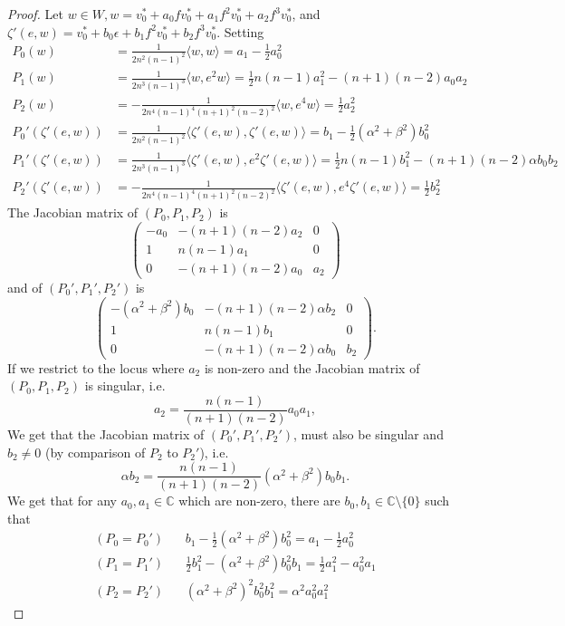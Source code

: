 \documentclass[10pt,a4paper]{amsart}
\newcommand{\CC}{\mathbb{C}}
\begin{document}
\begin{proof}
    Let $w\in W, w = v_0^*+a_0fv_0^* + a_1f^2v_0^* + a_2 f^3v_0^*$, and $\zeta'(e, w) = v_0^* + b_0\epsilon + b_1f^2v_0^* + b_2f^3v_0^*$.
    Setting
    \[\begin{aligned}
        P_0(w) &= \frac{1}{2n^2(n-1)^2}\langle w, w\rangle = a_1-\frac{1}{2}a_0^2\\
        P_1(w) &= \frac{1}{2n^3(n-1)^3}\langle w, e^2 w\rangle = \frac{1}{2}n(n-1)a_1^2 - (n+1)(n-2)a_0a_2\\
        P_2(w) &= -\frac{1}{2n^4(n-1)^4(n+1)^2(n-2)^2}\langle w, e^4 w\rangle = \frac{1}{2}a_2^2\\
        P_0'(\zeta'(e, w)) &= \frac{1}{2n^2(n-1)^2}\langle \zeta'(e, w), \zeta'(e, w)\rangle = b_1-\frac{1}{2}(\alpha^2+\beta^2)b_0^2\\
        P_1'(\zeta'(e, w)) &= \frac{1}{2n^3(n-1)^3}\langle \zeta'(e, w), e^2 \zeta'(e, w)\rangle = \frac{1}{2}n(n-1)b_1^2 - (n+1)(n-2)\alpha b_0b_2\\
        P_2'(\zeta'(e, w)) &= -\frac{1}{2n^4(n-1)^4(n+1)^2(n-2)^2}\langle \zeta'(e, w), e^4 \zeta'(e, w)\rangle = \frac{1}{2}b_2^2
    \end{aligned}\]
    The Jacobian matrix of $(P_0, P_1, P_2)$ is $$\begin{pmatrix}
    -a_0&-(n+1)(n-2)a_2&0\\
    1&n(n-1)a_1&0\\
    0& -(n+1)(n-2)a_0 & a_2
    \end{pmatrix}$$
    and of $(P_0', P_1', P_2')$ is $$\begin{pmatrix}
    -(\alpha^2+\beta^2)b_0&-(n+1)(n-2)\alpha b_2&0\\
    1&n(n-1)b_1&0\\
    0& -(n+1)(n-2)\alpha b_0 & b_2
    \end{pmatrix}.$$
    If we restrict to the locus where $a_2$ is non-zero and the Jacobian matrix of $(P_0, P_1, P_2)$ is singular, i.e.
    $$a_2 = \frac{n(n-1)}{(n+1)(n-2)}a_0a_1,$$
    We get that the Jacobian matrix of $(P_0', P_1', P_2')$, must also be singular and $b_2\neq 0$ (by comparison of $P_2$ to $P_2'$), i.e.
    $$\alpha b_2 = \frac{n(n-1)}{(n+1)(n-2)}(\alpha^2+\beta^2)b_0b_1.$$
    We get that for any $a_0, a_1\in \CC$ which are non-zero, there are $b_0, b_1\in \CC\setminus\{0\}$ such that
    \[
    \begin{aligned}
        (P_0=P_0')&\ \ \ \ b_1-\frac{1}{2}(\alpha^2+\beta^2)b_0^2 = a_1-\frac{1}{2}a_0^2\\
        (P_1=P_1')&\ \ \ \ \frac{1}{2}b_1^2 - (\alpha^2+\beta^2)b_0^2b_1 = \frac{1}{2}a_1^2 - a_0^2a_1\\
        (P_2 = P_2')&\ \ \ \ (\alpha^2+\beta^2)^2b_0^2b_1^2 = \alpha^2 a_0^2a_1^2
    \end{aligned}
    \]


\end{proof}
\end{document}
